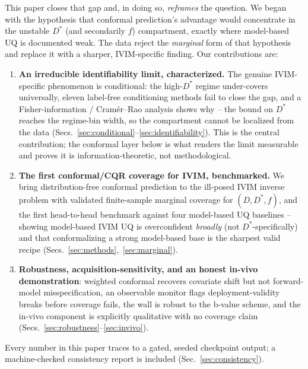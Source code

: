 \documentclass[11pt]{article}
\newcommand{\Dstar}{D^{*}}
\begin{document}
This paper closes that gap and, in doing so, \emph{reframes} the question. We began
with the hypothesis that conformal prediction's advantage would concentrate in the
unstable $\Dstar$ (and secondarily $f$) compartment, exactly where model-based UQ
is documented weak. The data reject the \emph{marginal} form of that hypothesis and
replace it with a sharper, IVIM-specific finding. Our contributions are:
\begin{enumerate}
\item \textbf{An irreducible identifiability limit, characterized.} The genuine
IVIM-specific phenomenon is conditional: the high-$\Dstar$ regime under-covers
universally, eleven label-free conditioning methods fail to close the gap, and a
Fisher-information / Cram\'er--Rao analysis shows why -- the bound on $\Dstar$
reaches the regime-bin width, so the compartment cannot be localized from the data
(Secs.~\ref{sec:conditional}--\ref{sec:identifiability}). This is the central
contribution; the conformal layer below is what renders the limit measurable and
proves it is information-theoretic, not methodological.
\item \textbf{The first conformal/CQR coverage for IVIM, benchmarked.} We bring
distribution-free conformal prediction to the ill-posed IVIM inverse problem with
validated finite-sample marginal coverage for $(D,\Dstar,f)$, and the first
head-to-head benchmark against four model-based UQ baselines -- showing model-based
IVIM UQ is overconfident \emph{broadly} (not $\Dstar$-specifically) and that
conformalizing a strong model-based base is the sharpest valid recipe
(Secs.~\ref{sec:methods},~\ref{sec:marginal}).
\item \textbf{Robustness, acquisition-sensitivity, and an honest in-vivo
demonstration}: weighted conformal recovers covariate shift but not
forward-model misspecification, an observable monitor flags deployment-validity
breaks before coverage fails, the wall is robust to the b-value scheme, and the
in-vivo component is explicitly qualitative with no coverage claim
(Secs.~\ref{sec:robustness}--\ref{sec:invivo}).
\end{enumerate}
Every number in this paper traces to a gated, seeded checkpoint output; a
machine-checked consistency report is included (Sec.~\ref{sec:consistency}).
\end{document}

